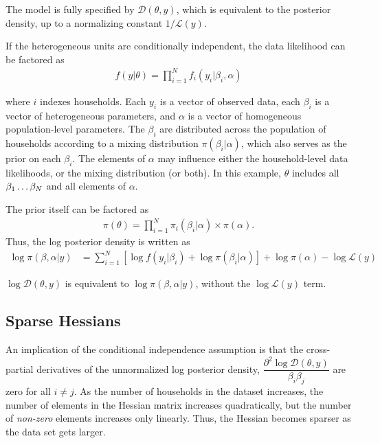 \documentclass[10pt]{article}\usepackage[]{graphicx}\usepackage[]{color}
\newcommand{\Ly}{\mathcal{L}(y)}
\newcommand{\Dy}{\mathcal{D}(\theta,y)}
\begin{document}
The model is fully specified by $\mathcal{D}(\theta,y)$, which is
equivalent to the posterior density, up to a normalizing constant $1/\Ly$.

If the heterogeneous units are conditionally independent, the data likelihood can be factored as
\begin{align}
f(y|\theta)=\prod_{i=1}^Nf_i\left(y_i|\beta_i,\alpha\right)
\end{align}

where $i$ indexes households. Each $y_i$ is a vector of observed data, each $\beta_i$ is a vector of
heterogeneous parameters, and $\alpha$ is a vector of homogeneous population-level
parameters.  The $\beta_i$ are distributed across the population of
households according to a mixing distribution $\pi(\beta_i|\alpha)$,
which also serves as the prior on each $\beta_i$.  The elements of $\alpha$
may influence either the household-level data likelihoods, or the
mixing distribution (or both).  In this example, $\theta$ includes all
$\beta_1\mathellipsis\beta_N$ and all elements of $\alpha$.

The prior itself can be factored as
\begin{align}
\pi(\theta)=\prod_{i=1}^N\pi_i(\beta_i|\alpha)\times\pi(\alpha).
\end{align}
Thus, the log posterior density is written as
\begin{align}
\log \pi(\beta,\alpha|y)&=\sum_{i=1}^N\left[\log f(y_i|\beta_i)+\log\pi(\beta_i|\alpha)\right]+\log\pi(\alpha)-\log\mathcal{L}(y)
\end{align}

$\log\Dy$ is equivalent to $\log \pi(\beta,\alpha|y)$, without the
$\log\Ly$ term.

\subsection{Sparse Hessians}\label{sec:sparseHessians}

An implication of the conditional independence
assumption is that the cross-partial derivatives of the unnormalized
log posterior density,
$\dfrac{\partial^2\log\Dy}{\beta_i\beta_j}$ are zero for all $i\neq
j$. As the number of households in the dataset increases, the number
of elements in the Hessian matrix increases quadratically, but the
number of \emph{non-zero} elements increases only linearly.  Thus, the
Hessian becomes sparser as the data set gets larger.
\end{document}
